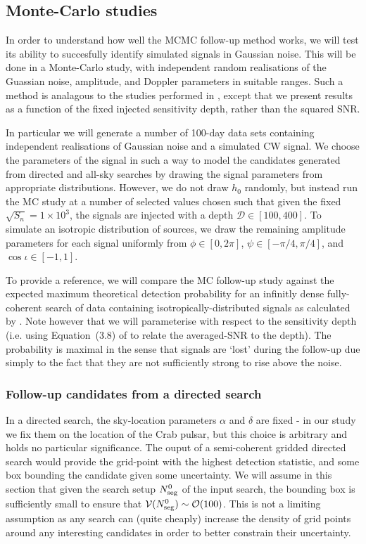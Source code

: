 \documentclass[aps, prd, twocolumn, superscriptaddress, floatfix, showpacs, nofootinbib, longbibliography]{revtex4-1}
\begin{document}
\subsection{Monte-Carlo studies}
\label{sec_MCS_zoom}

In order to understand how well the MCMC follow-up method works, we will test
its ability to succesfully identify simulated signals in Gaussian noise. This will be
done in a Monte-Carlo study, with independent random realisations of the
Guassian noise, amplitude, and Doppler parameters in suitable ranges. Such a
method is analagous to the studies performed in \citet{shaltev2013}, except
that we present results as a function of the fixed injected sensitivity depth,
rather than the squared SNR.

In particular we will generate a number of 100-day data sets containing
independent realisations of Gaussian noise and a simulated CW signal. We choose
the parameters of the signal in such a way to model the candidates generated
from directed and all-sky searches by drawing the signal parameters from
appropriate distributions. However, we do not draw $h_0$ randomly, but instead
run the MC study at a number of selected values chosen such that given the
fixed $\sqrt{S_n}=1\times10^{3}$, the signals are injected with a depth
$\mathcal{D} \in [100, 400]$.  To simulate an isotropic distribution of
sources, we draw the remaining amplitude parameters for each signal uniformly
from $\phi \in [0, 2\pi]$, $\psi \in [-\pi/4, \pi/4]$, and $\cos\iota \in [-1,
1]$.

To provide a reference, we will compare the MC follow-up study against the
expected maximum theoretical detection probability for an infinitly dense
fully-coherent search of data containing isotropically-distributed signals as
calculated by \citet{wette2012}. Note however that we will parameterise with
respect to the sensitivity depth (i.e. using Equation~(3.8) of \citet{wette2012} to
relate the averaged-SNR to the depth). The probability is maximal in the
sense that signals are `lost' during the follow-up due simply to the fact that
they are not sufficiently strong to rise above the noise.


\subsubsection{Follow-up candidates from a directed search}
\label{sec_directed_follow_up}

In a directed search, the sky-location parameters $\alpha$ and $\delta$ are
fixed - in our study we fix them on the location of the Crab pulsar, but this
choice is arbitrary and holds no particular significance. The ouput of a
semi-coherent gridded directed search would provide the grid-point with the
highest detection statistic, and some box bounding the candidate given some
uncertainty. We will assume in this section that given the search setup
$N_{\rm seg}^{0}$ of the input search, the bounding box is sufficiently small to
ensure that $\mathcal{V}(N_{\rm seg}^0)\sim \mathcal{O}(100)$. This is not a limiting
assumption as any search can (quite cheaply) increase the density of grid
points around any interesting candidates in order to better constrain their
uncertainty.
\end{document}

